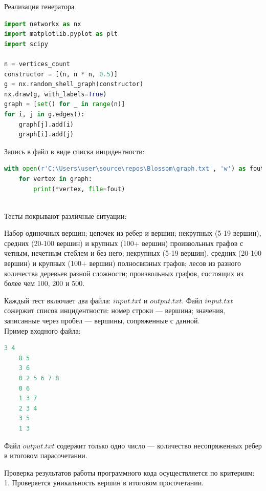 \documentclass[14pt, a4paper]{extarticle}
\begin{document}
    Реализация генератора

    \begin{lstlisting}[language=python]
import networkx as nx
import matplotlib.pyplot as plt
import scipy

n = vertices_count
constructor = [(n, n * n, 0.5)]
g = nx.random_shell_graph(constructor)
nx.draw(g, with_labels=True)
graph = [set() for _ in range(n)]
for i, j in g.edges():
    graph[j].add(i)
    graph[i].add(j)
    \end{lstlisting}

    Запись в файл в виде списка инцидентности:

    \begin{lstlisting}[language=python]
with open(r'C:\Users\user\source\repos\Blossom\graph.txt', 'w') as fout:
    for vertex in graph:
        print(*vertex, file=fout)
    \end{lstlisting}\\

    Тесты покрывают различные ситуации:

    Набор одиночных вершин; цепочек из ребер и вершин; некрупных (5-19 вершин), средних (20-100 вершин) и крупных (100+ вершин) произвольных графов с четным, нечетным стеблем и без него; некрупных (5-19 вершин), средних (20-100 вершин) и крупных (100+ вершин) полносвязных графов; лесов из разного количества деревьев разной сложности; произвольных графов, состоящих из более чем 100, 200 и 500.\\
    
    \pagebreak

    Каждый тест включает два файла: $input.txt$ и $output.txt$.
    Файл $input.txt$ сожержит список инцидентности: номер строки --- вершина; значения, записанные через пробел --- вершины, сопряженные с данной.\\

    Пример входного файла:

    \begin{lstlisting}[language=c++]
    3 4
    8 5
    3 6
    0 2 5 6 7 8
    0 6
    1 3 7
    2 3 4
    3 5
    1 3
    \end{lstlisting}    

    Файл $output.txt$ содержит только одно число --- количество несопряженных ребер в итоговом парасочетании.

    Проверка результатов работы программного кода осуществляется по критериям:\\

    1. Проверяется уникальность вершин в итоговом просочетании.\\
\end{document}
